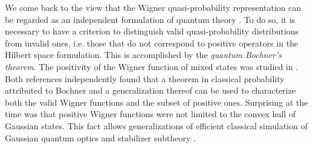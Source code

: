 We come back to the view that the Wigner quasi-probability representation can be regarded as an independent formulation of quantum theory \cite{moyal_quantum_1949,zachos2005quantum}. To do so, it is necessary to have a criterion to distinguish valid quasi-probability distributions from invalid ones, i.e. those that do not correspond to positive operators in the Hilbert space formulation. This is accomplished by the \emph{quantum Bochner's theorem}. The positivity of the Wigner function of mixed states was studied in \cite{srinivas_nonclassical_1975,brocker_mixed_1995}. Both references independently found that a theorem in classical probability attributed to Bochner \cite{bochner_monotone_1933} and a generalization thereof can be used to characterize both the valid Wigner functions and the subset of positive ones. Surprising at the time was that positive Wigner functions were not limited to the convex hull of Gaussian states.  This fact allows generalizations of efficient classical simulation of Gaussian quantum optics and stabilizer subtheory \cite{mari_positive_2012,veitch_negative_2012, veitch_efficient_2013}.

